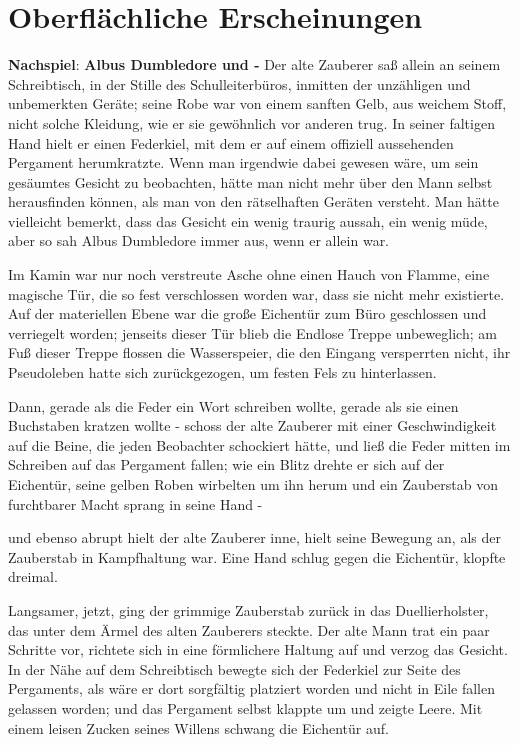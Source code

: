 \chapter{Oberflächliche Erscheinungen}

\textbf{Nachspiel}: \textbf{Albus Dumbledore und -} Der alte Zauberer saß
allein an seinem Schreibtisch, in der Stille des Schulleiterbüros, inmitten der
unzähligen und unbemerkten Geräte; seine Robe war von einem sanften Gelb, aus
weichem Stoff, nicht solche Kleidung, wie er sie gewöhnlich vor anderen trug. In
seiner faltigen Hand hielt er einen Federkiel, mit dem er auf einem offiziell
aussehenden Pergament herumkratzte. Wenn man irgendwie dabei gewesen wäre, um
sein gesäumtes Gesicht zu beobachten, hätte man nicht mehr über den Mann selbst
herausfinden können, als man von den rätselhaften Geräten versteht. Man hätte
vielleicht bemerkt, dass das Gesicht ein wenig traurig aussah, ein wenig müde,
aber so sah Albus Dumbledore immer aus, wenn er allein war.

Im Kamin war nur noch verstreute Asche ohne einen Hauch von Flamme, eine
magische Tür, die so fest verschlossen worden war, dass sie nicht mehr
existierte. Auf der materiellen Ebene war die große Eichentür zum Büro
geschlossen und verriegelt worden; jenseits dieser Tür blieb die Endlose Treppe
unbeweglich; am Fuß dieser Treppe flossen die Wasserspeier, die den Eingang
versperrten nicht, ihr Pseudoleben hatte sich zurückgezogen, um festen Fels zu
hinterlassen.

Dann, gerade als die Feder ein Wort schreiben wollte, gerade als sie einen
Buchstaben kratzen wollte - schoss der alte Zauberer mit einer Geschwindigkeit
auf die Beine, die jeden Beobachter schockiert hätte, und ließ die Feder mitten
im Schreiben auf das Pergament fallen; wie ein Blitz drehte er sich auf der
Eichentür, seine gelben Roben wirbelten um ihn herum und ein Zauberstab von
furchtbarer Macht sprang in seine Hand -

und ebenso abrupt hielt der alte Zauberer inne, hielt seine Bewegung an, als der
Zauberstab in Kampfhaltung war. Eine Hand schlug gegen die Eichentür, klopfte
dreimal.

Langsamer, jetzt, ging der grimmige Zauberstab zurück in das Duellierholster,
das unter dem Ärmel des alten Zauberers steckte. Der alte Mann trat ein paar
Schritte vor, richtete sich in eine förmlichere Haltung auf und verzog das
Gesicht. In der Nähe auf dem Schreibtisch bewegte sich der Federkiel zur Seite
des Pergaments, als wäre er dort sorgfältig platziert worden und nicht in Eile
fallen gelassen worden; und das Pergament selbst klappte um und zeigte Leere.
Mit einem leisen Zucken seines Willens schwang die Eichentür auf.

